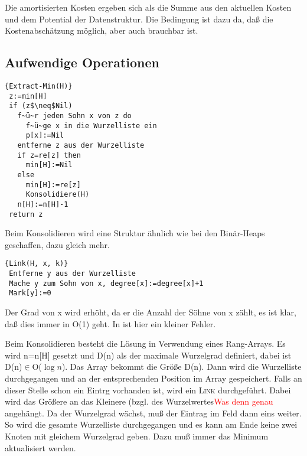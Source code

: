 Die amortisierten Kosten ergeben sich als die Summe aus den aktuellen Kosten und dem Potential der Datenstruktur. Die
Bedingung ist dazu da, daß die Kostenabschätzung möglich, aber auch brauchbar ist.

\subsection{Aufwendige Operationen}
\begin{Algorithmus}[H]
\begin{lstlisting}[frame=tlrb, mathescape=true, title=\textsc{Extract-Min\textnormal{(H)}}, gobble=1]{Extract-Min(H)}
 z:=min[H]
 if (z$\neq$Nil)
   f~ü~r jeden Sohn x von z do
     f~ü~ge x in die Wurzelliste ein
     p[x]:=Nil
   entferne z aus der Wurzelliste
   if z=re[z] then
     min[H]:=Nil
   else
     min[H]:=re[z]
     Konsolidiere(H)
   n[H]:=n[H]-1
 return z   
\end{lstlisting}
Beim Konsolidieren wird eine Struktur ähnlich wie bei den Binär-Heaps geschaffen, dazu gleich mehr.
\end{Algorithmus}

\begin{Algorithmus}[H]
\begin{lstlisting}[frame=tlrb, mathescape=true, title=\textsc{Link\textnormal{(H, x, k)}}, gobble=1]{Link(H, x, k)}
 Entferne y aus der Wurzelliste
 Mache y zum Sohn von x, degree[x]:=degree[x]+1
 Mark[y]:=0
\end{lstlisting}
Der Grad von x wird erhöht, da er die Anzahl der Söhne von x zählt, es ist klar, daß dies immer in O(1) geht. In
\cite{ottmann} ist hier ein kleiner Fehler.
\end{Algorithmus}

Beim Konsolidieren besteht die Lösung in Verwendung eines Rang-Arrays.
Es wird n=n[H] gesetzt und D(n) als der maximale Wurzelgrad definiert, dabei ist D(n)$\in$O($\log n$). Das Array bekommt 
die Größe D(n). Dann wird die Wurzelliste durchgegangen und an der entsprechenden Position im Array gespeichert. Falls
an dieser Stelle schon ein Eintrg vorhanden ist, wird ein \textsc{Link} durchgeführt. Dabei wird das Größere an das
Kleinere (bzgl. des Wurzelwertes\textcolor{red}{Was denn genau} angehängt. Da der Wurzelgrad wächst, muß der Eintrag
im Feld dann eins weiter. So wird die gesamte Wurzelliste durchgegangen und es kann am Ende keine zwei Knoten mit
gleichem Wurzelgrad geben. Dazu muß immer das Minimum aktualisiert werden.

